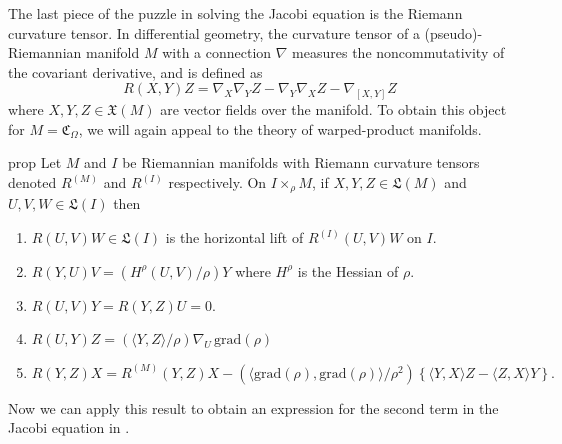 \documentclass[11pt]{article}
\newcommand{\man}{M}
\begin{document}
The last piece of the puzzle in solving the Jacobi equation is the Riemann curvature tensor. In differential geometry, the curvature tensor of a (pseudo)-Riemannian manifold $\man$ with a connection $\nabla$ measures the noncommutativity of the covariant derivative, and is defined as
\begin{equation*}
    R(X,Y)Z = \nabla_X \nabla_YZ - \nabla_Y\nabla_XZ - \nabla_{[X,Y]}Z
\end{equation*}
where $X,Y, Z \in \mathfrak{X}(\man)$ are vector fields over the manifold. To obtain this object for $\man = \mathfrak{C}_\Omega$, we will again appeal to the theory of warped-product manifolds. 
\begin{restatable}{prop}{} \label{prop: warped product curvature tensor}
      Let $\man$ and $I$ be Riemannian manifolds with Riemann curvature tensors denoted $R^{(\man)}$ and $R^{(I)}$ respectively. On $I \times_\rho \man$, if $X, Y, Z \in \mathfrak{L}(\man)$ and $U, V, W \in \mathfrak{L}(I)$ then
    \begin{enumerate}
        \item $R(U, V)W \in \mathfrak{L}(I)$ is the horizontal lift of $R^{(I)}(U,V)W$ on $I$.
        \item $R(Y,U)V = (H^\rho(U,V)/\rho)Y$ where $H^\rho$ is the Hessian of $\rho$.
        \item $R(U,V)Y = R(Y,Z)U = 0.$
        \item $R(U,Y)Z = (\langle Y,Z\rangle/\rho)\nabla_U^{}\,\text{grad}(\rho)$\item $R(Y,Z)X =  R^{(\man)}(Y,Z)X - (\langle \text{grad}(\rho), \text{grad}(\rho)\rangle/\rho^2)\left\{\langle Y,X \rangle  Z - \langle Z, X\rangle Y\right\}.$
    \end{enumerate}
\end{restatable}
Now we can apply this result to obtain an expression for the second term in the Jacobi equation in . 
\end{document}

